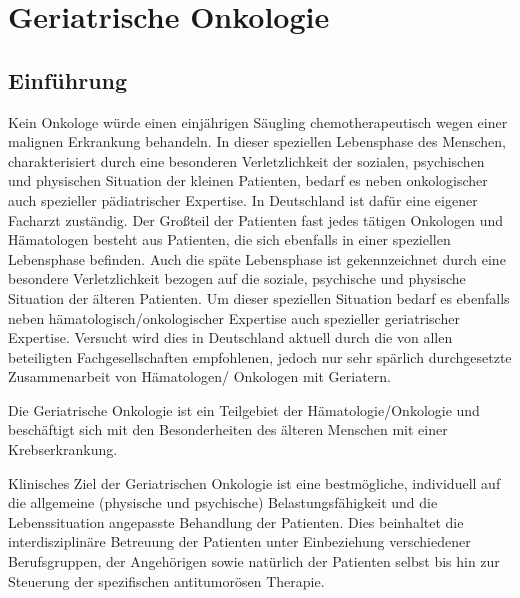 
\chapter{Geriatrische Onkologie}

\section{Einführung}

Kein Onkologe würde einen einjährigen Säugling chemotherapeutisch
wegen einer malignen Erkrankung behandeln. In dieser speziellen
Lebensphase des Menschen, charakterisiert durch eine besonderen
Verletzlichkeit der sozialen, psychischen und physischen Situation der
kleinen Patienten, bedarf es neben onkologischer auch spezieller
pädiatrischer Expertise. In Deutschland ist dafür eine eigener
Facharzt zuständig.
Der Großteil der Patienten fast jedes tätigen Onkologen und
Hämatologen besteht aus Patienten, die sich ebenfalls in einer
speziellen Lebensphase befinden. Auch die späte Lebensphase ist
gekennzeichnet durch eine besondere Verletzlichkeit bezogen auf die
soziale, psychische und physische Situation der älteren Patienten. Um
dieser speziellen Situation bedarf es ebenfalls neben
hämatologisch/onkologischer Expertise auch spezieller geriatrischer
Expertise. Versucht wird dies in Deutschland aktuell durch die von
allen beteiligten Fachgesellschaften empfohlenen, jedoch nur sehr
spärlich durchgesetzte Zusammenarbeit von Hämatologen/ Onkologen mit
Geriatern.

Die Geriatrische Onkologie ist ein Teilgebiet der
Hämatologie/Onkologie und beschäftigt sich mit den Besonderheiten des
älteren Menschen mit einer Krebserkrankung.

Klinisches Ziel der Geriatrischen Onkologie ist eine bestmögliche,
individuell auf die allgemeine (physische und psychische)
Belastungsfähigkeit und die Lebenssituation angepasste Behandlung der
Patienten. Dies beinhaltet die interdisziplinäre Betreuung der
Patienten unter Einbeziehung  verschiedener Berufsgruppen, der
Angehörigen sowie natürlich der Patienten selbst bis hin zur Steuerung
der spezifischen antitumorösen Therapie.

